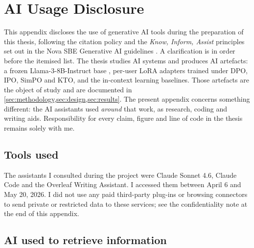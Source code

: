 
\section{AI Usage Disclosure}
\label{app:ai}

This appendix discloses the use of generative AI tools during the preparation
of this thesis, following the citation policy and the \emph{Know, Inform,
Assist} principles set out in the Nova SBE Generative AI guidelines
\citep{novasbe-genai}. A clarification is in order before the itemised list.
The thesis studies AI systems and produces AI artefacts: a frozen
Llama-3-8B-Instruct base \citep{llama3}, per-user LoRA adapters
\citep{hu2021lora} trained under DPO, IPO, SimPO and KTO, and the in-context
learning baselines. Those artefacts are the object of study and are documented
in \cref{sec:methodology,sec:design,sec:results}. The present appendix concerns
something different: the AI assistants used \emph{around} that work, as
research, coding and writing aids. Responsibility for every claim, figure and
line of code in the thesis remains solely with me.

\subsection*{Tools used}

The assistants I consulted during the project were Claude Sonnet 4.6, Claude Code and the Overleaf Writing Assistant.
I accessed them between April 6 and May 20, 2026.
I did not use any paid third-party plug-ins or browsing connectors to send
private or restricted data to these services; see the confidentiality note at
the end of this appendix.

\subsection*{AI used to retrieve information}

